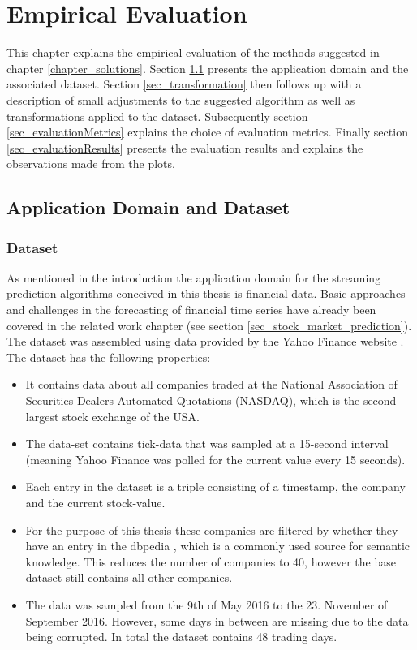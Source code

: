 \chapter{Empirical Evaluation}
\label{chapter_evaluation}

\ifpdf
    \graphicspath{{Chapter5/Figs/Raster/}{Chapter5/Figs/PDF/}{Chapter5/Figs/}}
\else
    \graphicspath{{Chapter5/Figs/Vector/}{Chapter5/Figs/}}
\fi

This chapter explains the empirical evaluation of the methods suggested in chapter \ref{chapter_solutions}. Section \ref{sec_applicationDomain} presents the application domain and the associated dataset. Section \ref{sec_transformation} then follows up with a description of small adjustments to the suggested algorithm as well as transformations applied to the dataset. Subsequently section \ref{sec_evaluationMetrics} explains the choice of evaluation metrics. Finally section \ref{sec_evaluationResults} presents the evaluation results and explains the observations made from the plots.

\section{Application Domain and Dataset}
\label{sec_applicationDomain}

\subsection{Dataset}
As mentioned in the introduction the application domain for the streaming prediction algorithms conceived in this thesis is financial data. Basic approaches and challenges in the forecasting of financial time series have already been covered in the related work chapter (see section \ref{sec_stock_market_prediction}). The dataset was assembled using data provided by the Yahoo Finance website \cite{yahooFinance}. The dataset has the following properties:
\begin{itemize}
	\item It contains data about all companies traded at the National Association of Securities Dealers Automated Quotations (NASDAQ), which is the second largest stock exchange of the USA.
	\item The data-set contains tick-data that was sampled at a 15-second interval (meaning Yahoo Finance was polled for the current value every 15 seconds).
	\item Each entry in the dataset is a triple consisting of a timestamp, the company and the current stock-value.
	\item For the purpose of this thesis these companies are filtered by whether they have an entry in the dbpedia \cite{auer2007dbpedia}, which is a commonly used source for semantic knowledge. This reduces the number of companies to 40, however the base dataset still contains all other companies.
	\item The data was sampled from the 9th of May 2016 to the 23. November of September 2016. However, some days in between are missing due to the data being corrupted. In total the dataset contains 48 trading days.
\end{itemize}

